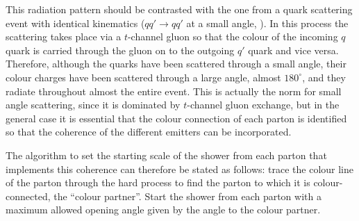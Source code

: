This radiation pattern should be contrasted with the one from a quark
scattering event with identical kinematics (\ie $qq'\to qq'$ at a small
angle, ).  In this process the
scattering takes place via a $t$-channel
gluon so that the colour of the incoming $q$ quark is carried through
the gluon on to the outgoing $q'$ quark and vice versa.  Therefore,
although the quarks have been scattered through a small angle, their
colour charges have been scattered through a large angle, almost
$180^\circ$, and they radiate throughout almost the entire event.  This
is actually the norm for small angle scattering, since it is dominated
by $t$-channel gluon exchange, but in the general case it is essential
that the colour connection of each parton is identified so that the
coherence of the different emitters can be incorporated.

The algorithm to set the starting scale of the shower from each parton
that implements this coherence
can therefore be stated as follows: trace the colour line of the parton
through the hard process to find the parton to which it is
colour-connected, the ``colour partner''.  Start the shower from each
parton with a maximum allowed opening angle given by the angle to the
colour partner.


